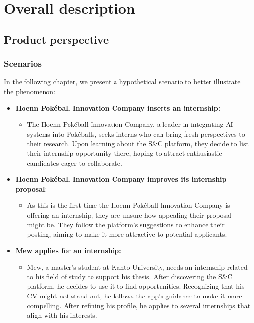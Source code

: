 \chapter{Overall description}

\section{Product perspective}

\subsection{Scenarios}

In the following chapter, we present a hypothetical scenario to better illustrate the phenomenon:

\begin{itemize}[leftmargin=*, label={}]
    \item \textbf{Hoenn Pokéball Innovation Company inserts an internship:}
    \begin{itemize}
        \item The Hoenn Pokéball Innovation Company, a leader in integrating AI systems into Pokéballs, seeks interns who can bring fresh perspectives to their research. Upon learning about the S\&C platform, they decide to list their internship opportunity there, hoping to attract enthusiastic candidates eager to collaborate.
    \end{itemize}

    \item \textbf{Hoenn Pokéball Innovation Company improves its internship proposal:}
    \begin{itemize}
        \item As this is the first time the Hoenn Pokéball Innovation Company is offering an internship, they are unsure how appealing their proposal might be. They follow the platform's suggestions to enhance their posting, aiming to make it more attractive to potential applicants.
    \end{itemize}

    \item \textbf{Mew applies for an internship:}
    \begin{itemize}
        \item Mew, a master’s student at Kanto University, needs an internship related to his field of study to support his thesis. After discovering the S\&C platform, he decides to use it to find opportunities. Recognizing that his CV might not stand out, he follows the app’s guidance to make it more compelling. After refining his profile, he applies to several internships that align with his interests.
    \end{itemize}


\end{itemize}
